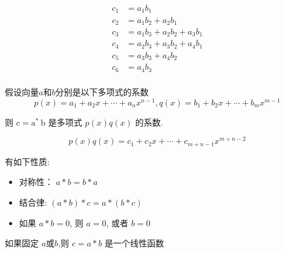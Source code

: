 \begin{example}
\begin{tikzpicture}[x=0.75pt,y=0.75pt,yscale=-1,xscale=1]
    
    \end{tikzpicture}
    
$$\begin{aligned}
    c_{1}&=a_{1} b_{1}\\
    c_{2}&=a_{1} b_{2}+a_{2} b_{1}\\
    c_{3}&=a_{1} b_{3}+a_{2} b_{2}+a_{3} b_{1}\\
    c_{4}&=a_{2} b_{3}+a_{3} b_{2}+a_{4} b_{1}\\
    c_{5}&=a_{3} b_{3}+a_{4} b_{2}\\
    c_{6}&=a_{4} b_{3}\\
\end{aligned} $$


\end{example}

\begin{corollary}
    假设向量$a$和$b$分别是以下多项式的系数
    $$ p(x)=a_{1}+a_{2} x+\cdots+a_{n} x^{n-1}, q(x)=b_{1}+b_{2} x+\cdots+b_{m} x^{m-1} $$

    则 $ \mathrm{c}=\mathrm{a}^{*} \mathrm{~b} $ 是多项式 $ p(x) q(x) $ 的系数.

    $$ p(x) q(x)=c_{1}+c_{2} x+\cdots+c_{m+n-1} x^{m+n-2} $$
\end{corollary}

\begin{corollary}[卷积性质]
    有如下性质:
    \begin{itemize}
        \item 对称性： $ a * b=b * a $
        \item 结合律: $ (a * b) * c=a *(b * c) $
        \item 如果 $ a * b=0 $, 则 $ a=0 $, 或者 $ b=0 $
    \end{itemize}
\end{corollary}

\begin{corollary}
    如果固定 $ a $或$b$,则 $ c=a * b $ 是一个线性函数
\end{corollary}

